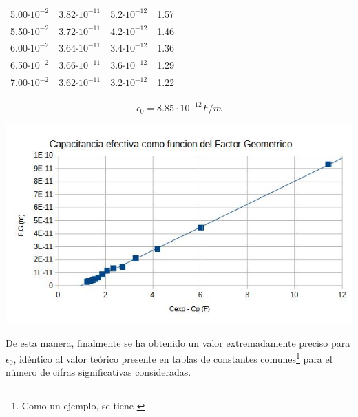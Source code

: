 \documentclass[a4paper,12pt]{article}
\begin{document}
\begin{table}[h!]
\begin{tabular}{|r|r|r|r|l|}
    \cline{1-4}
    5.00$\cdot 10^{-2}$                   & 3.82$\cdot 10^{-11}$                     & 5.2$\cdot 10^{-12}$                         & 1.57             &                                         \\ 
    \cline{1-4}
    5.50$\cdot 10^{-2}$                   & 3.72$\cdot 10^{-11}$                     & 4.2$\cdot 10^{-12}$                         & 1.46              &                                         \\ 
    \cline{1-4}
    6.00$\cdot 10^{-2}$                   & 3.64$\cdot 10^{-11}$                     & 3.4$\cdot 10^{-12}$                         & 1.36             &                                         \\ 
    \cline{1-4}
    6.50$\cdot 10^{-2}$                   & 3.66$\cdot 10^{-11}$                     & 3.6$\cdot 10^{-12}$                         & 1.29             &                                         \\ 
    \cline{1-4}
    7.00$\cdot 10^{-2}$                   & 3.62$\cdot 10^{-11}$                     & 3.2$\cdot 10^{-12}$                         & 1.22            &                                         \\
    \hline
    \end{tabular}
\end{table}


\begin{tcolorbox}
    \begin{equation}
        \epsilon_0 = 8.85 \cdot 10^{-12} F/m
    \end{equation}
\end{tcolorbox}

\includegraphics[width=\textwidth]{G2.jpg}

De esta manera, finalmente se ha obtenido un valor extremadamente preciso para $\epsilon_0$, idéntico al valor teórico presente en tablas de constantes comunes\footnote{Como un ejemplo, se tiene \cite[1420]{Tipler}} para el número de cifras significativas consideradas.
\end{document}
